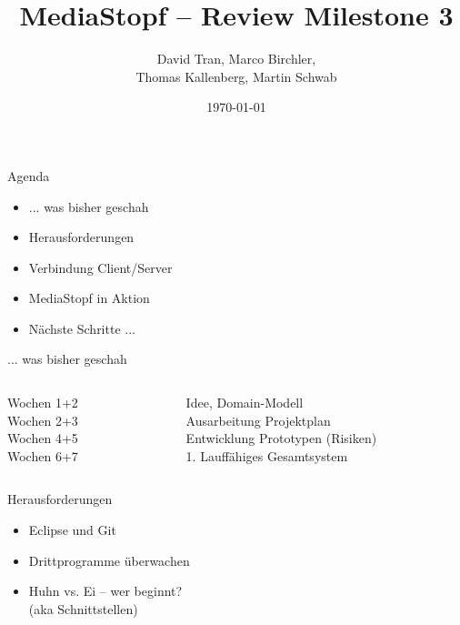\documentclass[]{beamer}
\title{MediaStopf -- Review Milestone 3}
\author{David Tran, Marco Birchler, \\ Thomas Kallenberg, Martin Schwab}
\institute{HSR Hochschule Rapperswil}
\date{ \today }
\begin{document}
\begin{frame}
  \titlepage
\end{frame}

\begin{frame}{Agenda}
\begin{itemize} %
\item ... was bisher geschah
\item Herausforderungen
\item Verbindung Client/Server
\item MediaStopf in Aktion
\item Nächste Schritte ...
\end{itemize}
\end{frame}


\begin{frame}{... was bisher geschah}
\begin{columns}[t]
  \begin{column}{3cm}
    Wochen 1+2 \\
    Wochen 2+3 \\
    Wochen 4+5 \\
    Wochen 6+7 \\
  \end{column}
  \begin{column}{7cm}
    Idee, Domain-Modell \\
    Ausarbeitung Projektplan \\
    Entwicklung Prototypen \small{(Risiken)} \\
    1. Lauffähiges Gesamtsystem
  \end{column}
\end{columns}
\end{frame}

\begin{frame}{Herausforderungen}
\begin{itemize}
\item<1-> Eclipse und Git
\item<2-> Drittprogramme überwachen
\item<3-4> Huhn vs. Ei -- wer beginnt? \\ \small{(aka Schnittstellen)}
\end{itemize}
\end{frame}
\end{document}
